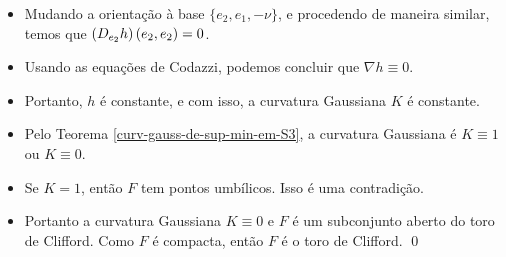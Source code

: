 \documentclass[10pt,a4paper]{beamer}
\theoremstyle{definition}
\begin{document}
\begin{frame}

	\begin{itemize}	
		
		\item Mudando a orientação à base $\{ e_2, e_1, -\nu \}$, e procedendo de maneira similar, temos que $\left( D_{e_2}h \right) \left( e_2,e_2 \right)=0$.
		
		\pause
		
		\item Usando as equações de Codazzi, podemos concluir que $\nabla h \equiv 0$.
		
		\pause
		
		\item Portanto, $h$ é constante, e com isso, a curvatura Gaussiana $K$ é constante.

		\pause

		\item Pelo Teorema \ref{curv-gauss-de-sup-min-em-S3}, a curvatura Gaussiana é $K \equiv 1$ ou $K \equiv 0$.
		
		\pause
		
		\item Se $K=1$, então $F$ tem pontos umbílicos. 
		Isso é uma contradição.
		
		\pause
		
		\item Portanto a curvatura Gaussiana $K \equiv 0$ e $F$ é um subconjunto aberto do toro de Clifford.
		Como $F$ é compacta, então $F$ é o toro de Clifford.
		\qed
	\end{itemize}

\end{frame}
\end{document}
